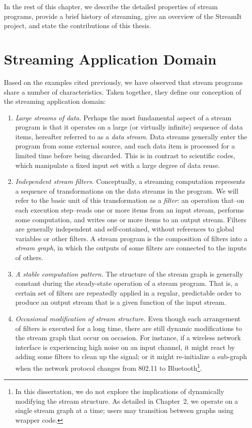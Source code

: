 In the rest of this chapter, we describe the detailed properties of
stream programs, provide a brief history of streaming, give an
overview of the StreamIt project, and state the contributions of this
thesis.

\section{Streaming Application Domain}

Based on the examples cited previously, we have observed that stream
programs share a number of characteristics.  Taken together, they
define our conception of the streaming application domain:

\begin{enumerate}

\item {\it Large streams of data.}  Perhaps the most fundamental
  aspect of a stream program is that it operates on a large (or
  virtually infinite) sequence of data items, hereafter referred to as
  a {\it data stream}.  Data streams generally enter the program from
  some external source, and each data item is processed for a limited
  time before being discarded.  This is in contrast to scientific
  codes, which manipulate a fixed input set with a large degree of
  data reuse.

\item {\it Independent stream filters.}  Conceptually, a streaming
  computation represents a sequence of transformations on the data
  streams in the program.  We will refer to the basic unit of this
  transformation as a {\it filter}: an operation that--on each
  execution step--reads one or more items from an input stream,
  performs some computation, and writes one or more items to an output
  stream.  Filters are generally independent and self-contained,
  without references to global variables or other filters.  A stream
  program is the composition of filters into a {\it stream graph}, in
  which the outputs of some filters are connected to the inputs of
  others.

\item {\it A stable computation pattern.}  The structure of the stream
  graph is generally constant during the steady-state operation of a
  stream program.  That is, a certain set of filters are repeatedly
  applied in a regular, predictable order to produce an output stream
  that is a given function of the input stream.

\item {\it Occasional modification of stream structure.}  Even though
  each arrangement of filters is executed for a long time, there are
  still dynamic modifications to the stream graph that occur on
  occasion.  For instance, if a wireless network interface is
  experiencing high noise on an input channel, it might react by
  adding some filters to clean up the signal; or it might
  re-initialize a sub-graph when the network protocol changes from
  802.11 to Bluetooth\footnote{In this dissertation, we do not explore
    the implications of dynamically modifying the stream structure.
    As detailed in Chapter~2, we operate on a single stream graph at a
    time; users may transition between graphs using wrapper code.}.


\end{enumerate}
